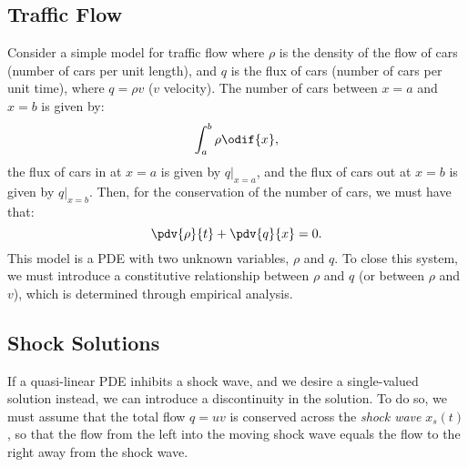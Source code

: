 \documentclass{article}
\theoremstyle{definition}
\begin{document}
\subsection{Traffic Flow}
Consider a simple model for traffic flow where \(\rho\) is the density
of the flow of cars (number of cars per unit length), and \(q\) is the
flux of cars (number of cars per unit time), where \(q = \rho v\)
(\(v\) velocity). The number of cars between \(x = a\) and \(x = b\) is
given by:
\begin{equation*}
    \int_a^b \rho \odif{x},
\end{equation*}
the flux of cars in at \(x = a\) is given by \(\left. q \right|_{x = a}\),
and the flux of cars out at \(x = b\) is given by \(\left. q \right|_{x = b}\).
Then, for the conservation of the number of cars, we must have that:
\begin{equation*}
    \pdv{\rho}{t} + \pdv{q}{x} = 0.
\end{equation*}
This model is a PDE with two unknown variables, \(\rho\) and \(q\).
To close this system, we must introduce a constitutive relationship
between \(\rho\) and \(q\) (or between \(\rho\) and \(v\)), which is
determined through empirical analysis.
\subsection{Shock Solutions}
If a quasi-linear PDE inhibits a shock wave, and we desire a
single-valued solution instead, we can introduce a discontinuity in the
solution. To do so, we must assume that the total flow \(q = u v\) is
conserved across the \textit{shock wave} \(x_s\left( t \right)\), so
that the flow from the left into the moving shock wave equals the flow
to the right away from the shock wave.
\end{document}
